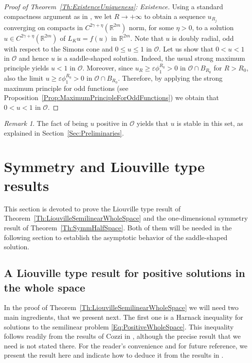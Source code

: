 \documentclass[12pt,reqno]{amsart}
\theoremstyle{definition}
\theoremstyle{remark}
\newtheorem{remark}[theorem]{Remark}
\newcommand{\con}[1]{\mathbb{#1}}
\newcommand{\R}{\con{R}} %
\newcommand{\ocal}{\mathcal{O}}
\newcommand{\s}{\gamma}
\numberwithin{equation}{section}
\begin{document}
\begin{proof}[Proof of Theorem~\ref{Th:ExistenceUniqueness}: Existence]
	Using a standard compactness argument as in \cite{FelipeSanz-Perela:IntegroDifferentialI}, we let $R\to +\infty$ to obtain a sequence $u_{R_j}$ converging on compacts in  $C^{2\s + \eta}(\R^{2m})$ norm, for some $\eta > 0$, to a solution $u \in C^{2\s + \eta}(\R^{2m})$ of $L_K u = f(u)$ in $\R^{2m}$. Note that $u$ is doubly radial, odd with respect to the Simons cone and $0\leq u \leq 1$ in $\ocal$. Let us show that $0 < u < 1$ in $\ocal$ and hence $u$ is a saddle-shaped solution. Indeed, the usual strong maximum principle yields $u<1$ in $\ocal$. Moreover, since $u_R\geq\varepsilon \phi_1^{R_0}>0$ in  $\ocal \cap B_{R_0}$ for $R>R_0$, also the limit $u\geq\varepsilon \phi_1^{R_0}>0$ in  $\ocal \cap B_{R_0}$. Therefore, by applying the strong maximum principle for odd functions (see Proposition~\ref{Prop:MaximumPrincipleForOddFunctions}) we obtain that $0 < u < 1$ in $\ocal$.
\end{proof}


\begin{remark}
	The fact of being $u$ positive in $\ocal$ yields that $u$ is stable in this set, as explained in Section~\ref{Sec:Preliminaries}. 
\end{remark}

\section{Symmetry and Liouville type results}
\label{Sec:SymmetryResults}




This section is devoted to prove the Liouville type result of Theorem~\ref{Th:LiouvilleSemilinearWholeSpace} and the one-dimensional symmetry result of Theorem~\ref{Th:SymmHalfSpace}. Both of them will be needed in the following section to establish the asymptotic behavior of the saddle-shaped solution. 

\subsection{A Liouville type result for positive solutions in the whole space}

In the proof of Theorem~\ref{Th:LiouvilleSemilinearWholeSpace} we will need two main ingredients, that we present next. The first one is a Harnack inequality for solutions to the semilinear problem \eqref{Eq:PositiveWholeSpace}. This inequality follows readily from the results of Cozzi in \cite{Cozzi-DeGiorgiClassesLong}, although the precise result that we need is not stated there. For the reader's convenience and for future reference, we present the result here and indicate how to deduce it from the results in \cite{Cozzi-DeGiorgiClassesLong}.
\end{document}
